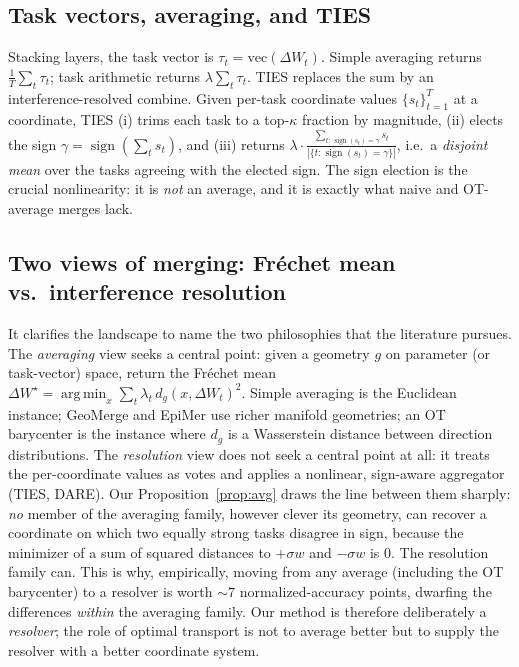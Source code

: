 \documentclass[11pt]{article}
\newcommand{\dW}{\Delta W}
\newcommand{\sign}{\operatorname{sign}}
\newcommand{\argmin}{\operatorname*{arg\,min}}
\begin{document}
\subsection{Task vectors, averaging, and TIES}
Stacking layers, the task vector is $\tau_t = \mathrm{vec}(\dW_t)$. Simple averaging returns
$\frac{1}{T}\sum_t\tau_t$; task arithmetic returns $\lambda\sum_t \tau_t$. TIES \citep{yadav2023ties}
replaces the sum by an interference-resolved combine. Given per-task coordinate values
$\{s_t\}_{t=1}^T$ at a coordinate, TIES (i) trims each task to a top-$\kappa$ fraction by magnitude,
(ii) elects the sign $\gamma=\sign(\sum_t s_t)$, and (iii) returns
$\lambda\cdot \frac{\sum_{t:\,\sign(s_t)=\gamma} s_t}{|\{t:\sign(s_t)=\gamma\}|}$, i.e.\ a
\emph{disjoint mean} over the tasks agreeing with the elected sign. The sign election is the crucial
nonlinearity: it is \emph{not} an average, and it is exactly what naive and OT-average merges lack.

\subsection{Two views of merging: Fr\'echet mean vs.\ interference resolution}
\label{sec:twoviews}
It clarifies the landscape to name the two philosophies that the literature pursues. The
\emph{averaging} view seeks a central point: given a geometry $g$ on parameter (or task-vector) space,
return the Fr\'echet mean $\dW^\star=\argmin_{x}\sum_t \lambda_t\, d_g(x,\dW_t)^2$. Simple averaging is the
Euclidean instance; GeoMerge \citep{dasilva2026geomerge} and EpiMer \citep{lu2026epimer} use richer
manifold geometries; an OT barycenter is the instance where $d_g$ is a Wasserstein distance between
direction distributions. The \emph{resolution} view does not seek a central point at all: it treats the
per-coordinate values as votes and applies a nonlinear, sign-aware aggregator (TIES, DARE). Our
Proposition~\ref{prop:avg} draws the line between them sharply: \emph{no} member of the averaging family,
however clever its geometry, can recover a coordinate on which two equally strong tasks disagree in sign,
because the minimizer of a sum of squared distances to $+\sigma w$ and $-\sigma w$ is $0$. The resolution
family can. This is why, empirically, moving from any average (including the OT barycenter) to a resolver
is worth $\sim\!7$ normalized-accuracy points, dwarfing the differences \emph{within} the averaging
family. Our method is therefore deliberately a \emph{resolver}; the role of optimal transport is not to
average better but to supply the resolver with a better coordinate system.
\end{document}
